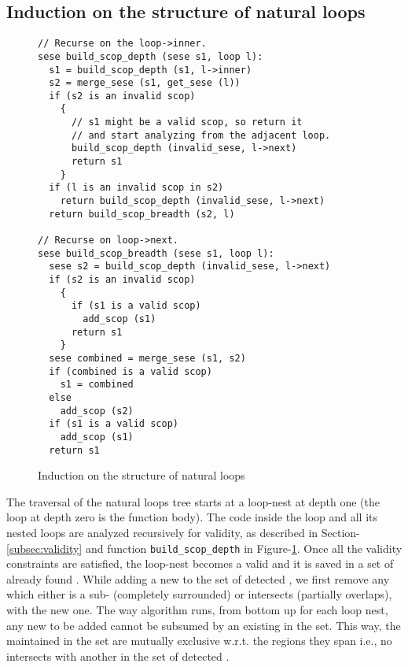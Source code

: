 \documentclass{sig-alternate}
\begin{document}
\subsection{Induction on the structure of natural loops}
\label{subsec:induction}

\begin{figure}
\begin{verbatim}
// Recurse on the loop->inner.
sese build_scop_depth (sese s1, loop l):
  s1 = build_scop_depth (s1, l->inner)
  s2 = merge_sese (s1, get_sese (l))
  if (s2 is an invalid scop)
    {
      // s1 might be a valid scop, so return it
      // and start analyzing from the adjacent loop.
      build_scop_depth (invalid_sese, l->next)
      return s1
    }
  if (l is an invalid scop in s2)
    return build_scop_depth (invalid_sese, l->next)
  return build_scop_breadth (s2, l)

// Recurse on loop->next.
sese build_scop_breadth (sese s1, loop l):
  sese s2 = build_scop_depth (invalid_sese, l->next)
  if (s2 is an invalid scop)
    {
      if (s1 is a valid scop)
        add_scop (s1)
      return s1
    }
  sese combined = merge_sese (s1, s2)
  if (combined is a valid scop)
    s1 = combined
  else
    add_scop (s2)
  if (s1 is a valid scop)
    add_scop (s1)
  return s1
\end{verbatim}
\caption{Induction on the structure of natural loops}
\label{fig:induction}
\end{figure}

The traversal of the natural loops tree starts at a loop-nest at depth one
(the loop at depth zero is the function body).
The code inside the loop and all its nested loops are analyzed recursively for
validity, as described in Section-\ref{subsec:validity} and
function \texttt{build\_scop\_depth} in
Figure-\ref{fig:induction}.  Once all the validity constraints are satisfied,
the loop-nest becomes a valid \SCoP{} and it is saved in a set of
already found . While adding a new \SCoP{} to the set of detected , we
first remove any \SCoP{} which either is a sub-\SCoP{} (completely surrounded) or
intersects (partially overlaps), with the new one. The way algorithm runs, from
bottom up for each loop nest, any new \SCoP{} to be added cannot be subsumed by an
existing \SCoP{} in the set. This way, the  maintained in the set are
mutually exclusive w.r.t. the regions they span i.e., no \SCoP{} intersects with
another in the set of detected .
\end{document}
